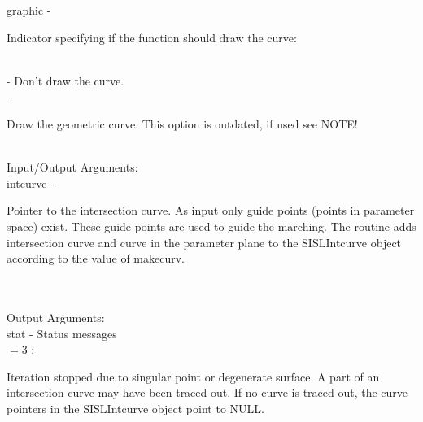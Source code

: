         \>\>    {\fov graphic}\> - \>   \begin{minipg2}
                                Indicator specifying if the function
                                should draw the curve:
                                \end{minipg2}\\
                \>\>\>\> -     \>Don't draw the curve.\\
                \>\>\>\> -     \>\begin{minipg5}
                                        Draw the geometric curve. This option is
                                        outdated, if used see NOTE!
                                        \end{minipg5} \\[0.8ex]
\newpagetabs
        \>Input/Output Arguments:\\
        \>\>    {\fov intcurve}\> - \>  \begin{minipg2}
                                Pointer to the intersection curve.
                                As input only
                                guide points (points in parameter space)
                                exist. These guide points
                                are used to guide the marching.
                                The routine adds
                                intersection curve and curve in the parameter
                                plane to the SISLIntcurve object according to the value
                                of makecurv.
                                \end{minipg2}\\[0.8ex]
\\
        \>Output Arguments:\\
        \>\>    {\fov stat}     \> - \> Status messages\\
                \>\>\>\>\>      $= 3$ : \>      \begin{minipg5}
                                                Iteration stopped due to singular
                                                point or degenerate surface. A part of an
                                                intersection curve may have been
                                                traced out. If no curve is traced out,
                                                the curve pointers in the SISLIntcurve
                                                object point to NULL.
                                                \end{minipg5} \\[0.3ex]
